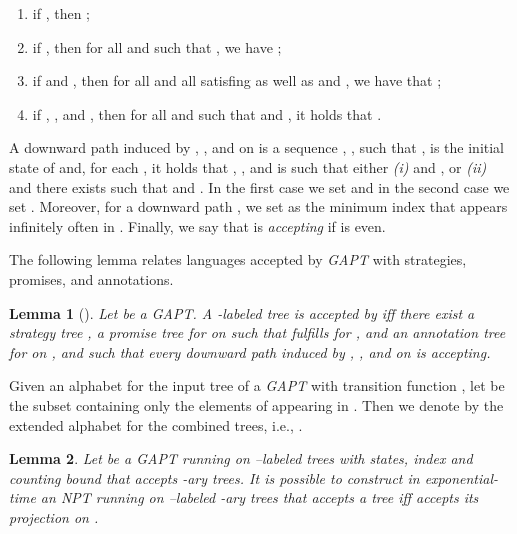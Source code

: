\documentclass{LMCS}
\theoremstyle{plain}
\def \NPT           {\emph{NPT}\xspace}
\def \TGAPT         {\emph{GAPT}\xspace}
\newtheorem{lemma}{Lemma}
\begin{document}
\begin{enumerate}[]

\item
if , then ;

\item
if , then for all  and  such that , we
have ;

\item
if  and , then for all  and all  satisfing  as well as  and , we have that ;

\item
if , , and , then for all  and
 such that  and
, it holds that .
\end{enumerate}

A downward path induced by , , and  on
 is a sequence ,
,  such that ,  is
the initial state of  and, for each , it holds that
, , and  is such that either \emph{(i)}  and , or \emph{(ii)}  and there exists  such that  and
. In the first case we set
 and in the second case we set . Moreover,
for a downward path , we set  as the minimum
index that appears infinitely often in . Finally, we say that
 is \emph{accepting} if  is even.

The following lemma relates languages accepted by \TGAPT with
strategies, promises, and annotations.
\begin{lemma}[\cite{BLMV06}]\label{lem:TgaptAndStrategies}
Let  be a \TGAPT. A -labeled tree  is
accepted by  iff there exist a strategy tree ,
a promise tree  for  on  such that
 fulfills  for , and an annotation tree
 for  on ,  and
 such that every downward path induced by ,
, and  on  is accepting.
\end{lemma}

Given an alphabet  for the input tree of a \TGAPT with transition
function , let  be the subset containing only the
elements of  appearing in . Then we denote by  the
extended alphabet for the combined trees, i.e., .

\begin{lemma}\label{lem:FromTgaptToNpt}
Let  be a \TGAPT running on --labeled trees with 
states, index  and counting bound  that accepts -ary
trees. It is possible to construct in exponential-time an \NPT
 running on --labeled -ary trees that accepts a
tree iff  accepts its projection on .
\end{lemma}
\end{document}
